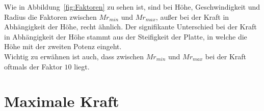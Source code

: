 Wie in Abbildung~\ref{fig:Faktoren} zu sehen ist, sind bei Höhe, Geschwindigkeit und Radius die Faktoren zwischen $Mr_{min}$ und $Mr_{max}$, außer bei der Kraft in Abhängigkeit der Höhe, recht ähnlich. Der signifikante Unterschied bei der Kraft in Abhängigkeit der Höhe stammt aus der Steifigkeit der Platte, in welche die Höhe mit der zweiten Potenz eingeht. \\
Wichtig zu erwähnen ist auch, dass zwischen $Mr_{min}$ und $Mr_{max}$ bei der Kraft oftmals der Faktor $10$ liegt.


\section{Maximale Kraft}
\label{sec:Kraft}


